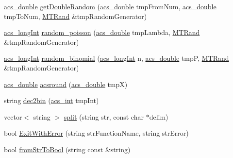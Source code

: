 \begin{DoxyCompactItemize}
\item 
\hyperlink{a00050_ab776853a005fcbf56af0424a2a4dd607}{acs\-\_\-double} \hyperlink{a00058_aed308af1d3ee40e106e4e23e78644d07}{get\-Double\-Random} (\hyperlink{a00050_ab776853a005fcbf56af0424a2a4dd607}{acs\-\_\-double} tmp\-From\-Num, \hyperlink{a00050_ab776853a005fcbf56af0424a2a4dd607}{acs\-\_\-double} tmp\-To\-Num, \hyperlink{a00016}{M\-T\-Rand} \&tmp\-Random\-Generator)
\item 
\hyperlink{a00050_a19319d75f02db4308bc5c0026d98cd85}{acs\-\_\-long\-Int} \hyperlink{a00058_a22cddb6ffcf2250e0c90bc913728350f}{random\-\_\-poisson} (\hyperlink{a00050_ab776853a005fcbf56af0424a2a4dd607}{acs\-\_\-double} tmp\-Lambda, \hyperlink{a00016}{M\-T\-Rand} \&tmp\-Random\-Generator)
\item 
\hyperlink{a00050_a19319d75f02db4308bc5c0026d98cd85}{acs\-\_\-long\-Int} \hyperlink{a00058_a78d5b4a67b6e66b8ceaa85874a2a12b7}{random\-\_\-binomial} (\hyperlink{a00050_a19319d75f02db4308bc5c0026d98cd85}{acs\-\_\-long\-Int} n, \hyperlink{a00050_ab776853a005fcbf56af0424a2a4dd607}{acs\-\_\-double} tmp\-P, \hyperlink{a00016}{M\-T\-Rand} \&tmp\-Random\-Generator)
\item 
\hyperlink{a00050_ab776853a005fcbf56af0424a2a4dd607}{acs\-\_\-double} \hyperlink{a00058_a277c801cb0f8a290d7c28b6a67feff18}{acsround} (\hyperlink{a00050_ab776853a005fcbf56af0424a2a4dd607}{acs\-\_\-double} tmp\-X)
\item 
string \hyperlink{a00058_a1a13653eb649b6fc74090deecddf1028}{dec2bin} (\hyperlink{a00050_a8d277355641a098190360234e2ebde35}{acs\-\_\-int} tmp\-Int)
\item 
vector$<$ string $>$ \hyperlink{a00058_a4d1aa74fac80ae0275c056575fdb6626}{split} (string str, const char $\ast$delim)
\item 
bool \hyperlink{a00058_aa678d0a98232158c48108227b98de4b6}{Exit\-With\-Error} (string str\-Function\-Name, string str\-Error)
\item 
bool \hyperlink{a00058_aed580149796de6350e6fcfae9b2adb30}{from\-Str\-To\-Bool} (string const \&string)
\end{DoxyCompactItemize}


